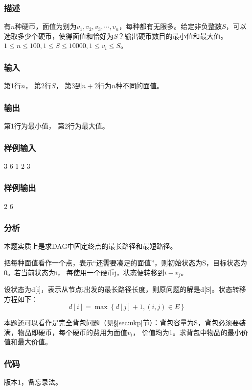 \subsubsection{描述}
有$n$种硬币，面值为别为$v_1,v_2,v_3,\cdots, v_n$，每种都有无限多。给定非负整数$S$，可以
选取多少个硬币，使得面值和恰好为$S$？输出硬币数目的最小值和最大值。
$1 \leq n \leq 100, 1 \leq S \leq 10000, 1 \leq v_i \leq S$。

\subsubsection{输入}
第1行$n$，
第2行$S$，
第3到$n+2$行为$n$种不同的面值。

\subsubsection{输出}
第1行为最小值，
第2行为最大值。

\subsubsection{样例输入}
\begin{Code}
3
6
1
2
3
\end{Code}

\subsubsection{样例输出}
\begin{Code}
2
6
\end{Code}

\subsubsection{分析}
本题实质上是求DAG中固定终点的最长路径和最短路径。

把每种面值看作一个点，表示“还需要凑足的面值”，则初始状态为S，目标状态为0。若当前状态为i，
每使用一个硬币j，状态便转移到$i-v_j$。

设状态为d[i]，表示从节点i出发的最长路径长度，则原问题的解是d[S]。状态转移方程如下：
$$d[i]=\max\left\{d[j]+1,(i,j) \in E\right\}$$

本题还可以看作是完全背包问题（见\S \ref{sec:ukp}节）：背包容量为S，背包必须要装满，物品即硬币，每个硬币的费用为面值$v_i$，
价值均为1。求背包中物品的最小价值和最大价值。

\subsubsection{代码}
版本1，备忘录法。

